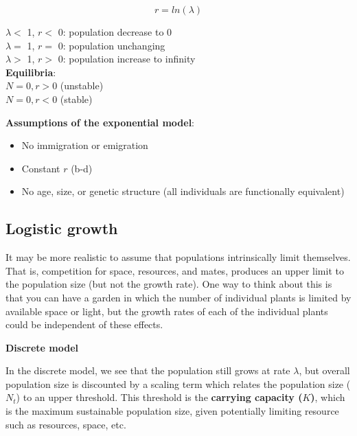\documentclass[12pt]{article}
\begin{document}
\begin{equation}
r = ln(\lambda) 
\end{equation}


$\lambda <$ 1, $r <$ 0: population decrease to 0 \\
$\lambda =$ 1, $r =$ 0: population unchanging \\
$\lambda >$ 1, $r >$ 0: population increase to infinity \\




\textbf{Equilibria}:\\

$N = 0, r > 0$ (unstable)\\
$N = 0 , r < 0$ (stable)




\textbf{Assumptions of the exponential model}:

\begin{itemize}
  \item No immigration or emigration
  \item Constant $r$ (b-d)
  \item No age, size, or genetic structure (all individuals are functionally equivalent)
\end{itemize}












\clearpage


\subsection*{Logistic growth}

It may be more realistic to assume that populations intrinsically limit themselves. That is, competition for space, resources, and mates, produces an upper limit to the population size (but not the growth rate). One way to think about this is that you can have a garden in which the number of individual plants is limited by available space or light, but the growth rates of each of the individual plants could be independent of these effects. 



\bigskip

\textbf{Discrete model}

In the discrete model, we see that the population still grows at rate $\lambda$, but overall population size is discounted by a scaling term which relates the population size ($N_t$) to an upper threshold. This threshold is the \textbf{carrying capacity ($K$)}, which is the maximum sustainable population size, given potentially limiting resource such as resources, space, etc. 
\end{document}
